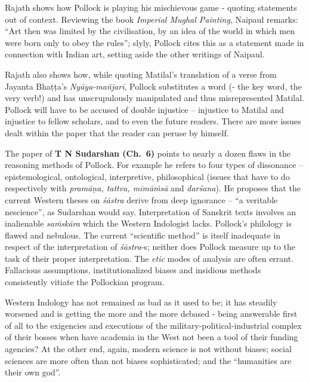 Rajath shows how Pollock is playing his mischievous game - quoting statements out of context. Reviewing the book {\sl Imperial Mughal Painting}, Naipaul remarks: “Art then was limited by the civilisation, by an idea of the world in which men were born only to obey the rules”; slyly, Pollock cites this as a statement made in connection with Indian art, setting aside the other writings of Naipaul.

Rajath also shows how, while quoting Matilal’s translation of a verse from Jayanta Bhaṭṭa’s {\sl Nyāya-mañjarī}, Pollock substitutes a word (- the key word, the very verb!) and has unscrupulously manipulated and thus misrepresented Matilal. Pollock will have to be accused of double injustice -- injustice to Matilal and injustice to fellow scholars, and to even the future readers. There are more issues dealt within the paper that the reader can peruse by himself.
\vskip 8pt

The paper of {\bf T N Sudarshan (Ch.~6)} points to nearly a dozen flaws in the reasoning methods of Pollock. For example he refers to four types of dissonance -- epistemological, ontological, interpretive, philosophical (issues that have to do respectively with {\sl pramāṇa, tattva, mīmāṁsā} and {\sl darśana}). He proposes that the current Western theses on {\sl śāstra} derive from deep ignorance -- “a veritable nescience”, as Sudarshan would say. Interpretation of Sanskrit texts involves an inalienable {\sl saṁskāra} which the Western Indologist lacks. Pollock’s philology is flawed and nebulous. The current “scientific method” is itself inadequate in respect of the interpretation of {\sl śāstra}-s; neither does Pollock measure up to the task of their proper interpretation. The {\sl etic} modes of analysis are often errant. Fallacious assumptions, institutionalized biases and insidious methods consistently vitiate the Pollockian program.

Western Indology has not remained as bad as it used to be; it has steadily worsened and is getting the more and the more debased - being answerable first of all to the exigencies and executions of the military-political-industrial complex of their bosses when have academia in the West not been a tool of their funding agencies? At the other end, again, modern science is not without biases; social sciences are more often than not biases sophisticated; and the “humanities are their own god”.

